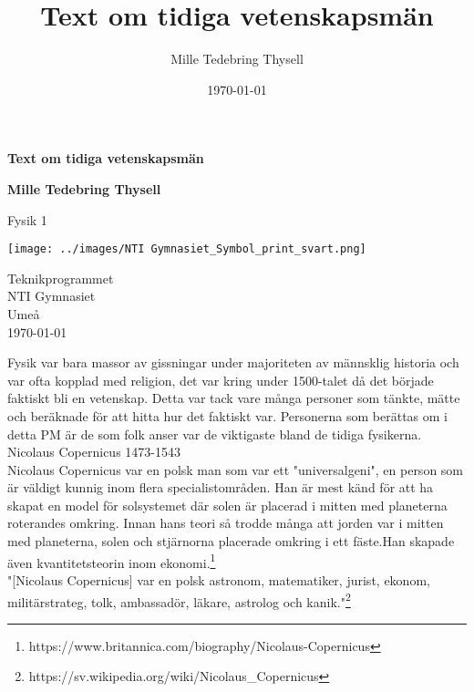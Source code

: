 \documentclass[11p]{article}
\title{Text om tidiga vetenskapsmän}
\author{Mille Tedebring Thysell }
\date{\today}
\begin{document}
    \begin{titlepage}
        \begin{center}
            \vspace*{1cm}

            \Huge
            \textbf{Text om tidiga vetenskapsmän}

            \vspace{0.5cm}
            \LARGE


            \vspace{1.5cm}

            \textbf{Mille Tedebring Thysell}

            \vfill


            Fysik 1

            \vspace{0.8cm}

            \texttt{[image: ../images/NTI Gymnasiet\_Symbol\_print\_svart.png]}

            \Large
            Teknikprogrammet\\
            NTI Gymnasiet\\
            Umeå\\
            \today

        \end{center}
    \end{titlepage}
    

    Fysik var bara massor av gissningar under majoriteten av männsklig historia och var ofta kopplad med religion,
    det var kring under 1500-talet då det började faktiskt bli en vetenskap. Detta var tack vare många personer som
    tänkte, mätte och beräknade för att hitta hur det faktiskt var. Personerna som berättas om i detta PM är de som folk
    anser var de viktigaste bland de tidiga fysikerna.\\

    \large Nicolaus Copernicus 1473-1543\\
    \normalsize
    Nicolaus Copernicus var en polsk man som var ett "universalgeni", en person som är väldigt
    kunnig inom flera specialistområden. Han är mest känd för att ha skapat en model för solsystemet där solen
    är placerad i mitten med planeterna roterandes omkring. Innan hans teori så trodde många att jorden var i
    mitten med planeterna, solen och stjärnorna placerade omkring i ett fäste.Han skapade även
    kvantitetsteorin inom ekonomi.\footnote{https://www.britannica.com/biography/Nicolaus-Copernicus}  \\
    "[Nicolaus Copernicus] var en polsk astronom, matematiker, jurist, ekonom, militärstrateg, tolk, ambassadör, läkare,
    astrolog och kanik."\footnote{https://sv.wikipedia.org/wiki/Nicolaus_Copernicus}\\
\end{document}
